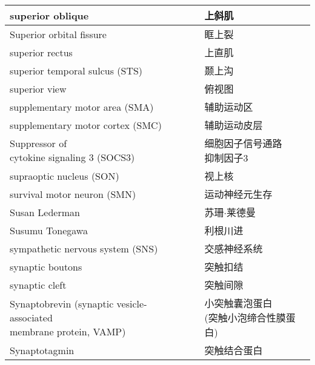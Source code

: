 \begin{longtable}{lll}
	\midrule
	superior oblique   && 上斜肌 \\
	
	\midrule
	Superior orbital fissure   && 眶上裂 \\
	
	\midrule
	superior rectus   && 上直肌 \\
	
	\midrule
	superior temporal sulcus (STS)   && 颞上沟 \\
	
	\midrule
	superior view   && 俯视图 \\
	
	\midrule
	supplementary motor area (SMA)   && 辅助运动区 \\
	
	\midrule
	supplementary motor cortex (SMC)   && 辅助运动皮层 \\
	
	\midrule
	\makecell[l]{Suppressor of \\cytokine signaling 3 (SOCS3)}  && \makecell[l]{细胞因子信号通路\\抑制因子3} \\
	
	\midrule
	supraoptic nucleus (SON)  && 视上核 \\
	
	\midrule
	survival motor neuron (SMN) && 运动神经元生存 \\
	
	\midrule
	Susan Lederman && 苏珊$\cdot$莱德曼 \\
	
	\midrule
	Susumu Tonegawa && 利根川进 \\
	
	\midrule
	sympathetic nervous system (SNS) && 交感神经系统 \\
	
	\midrule
	synaptic boutons && 突触扣结 \\
	
	\midrule
	synaptic cleft && 突触间隙 \\
	
	\midrule
	\makecell[l]{Synaptobrevin (synaptic vesicle-associated\\ membrane protein, VAMP)}   && \makecell[l]{小突触囊泡蛋白\\ (突触小泡缔合性膜蛋白)} \\
	
	\midrule
	Synaptotagmin   && 突触结合蛋白 \\
	

\end{longtable}
